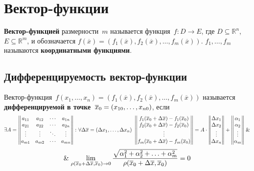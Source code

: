 \section{Вектор-функции}
 \textbf{Вектор-функцией} размерности~$m$ называется функция~$f \colon D \to E$, где $D \subseteq \mathbb R^n$, $E \subseteq \mathbb R^m$, и обозначается
$f(\overline x) = (f_1(\overline x), f_2(\overline x), \ldots, f_m(\overline x))$.
$f_1, \ldots, f_m$ называются \textbf{координатными функциями}.

\subsection{Дифференцируемость вектор-функции}
 Вектор-функция~$f(x_1, \ldots, x_n) = (f_1(\overline x), f_2(\overline x), \ldots, f_m(\overline x))$ называется \textbf{дифференцируемой в точке~$\overline x_0 \opbr= (x_{10}, \ldots, x_{n0})$}, если
\begin{equation*}
\exists A =
\begin{Vmatrix}
a_{11} & a_{12} & \cdots & a_{1n} \\
a_{21} & a_{22} & \cdots & a_{2n} \\
\vdots & \vdots & \ddots & \vdots \\
a_{m1} & a_{m2} & \cdots & a_{mn}
\end{Vmatrix} \colon
\forall \Delta \overline x = (\Delta x_1, \ldots, \Delta x_n) \
\begin{Vmatrix}
f_1(\overline x_0 + \Delta \overline x) - f_1(\overline x_0) \\
f_2(\overline x_0 + \Delta \overline x) - f_2(\overline x_0) \\
\vdots \\
f_m(\overline x_0 + \Delta \overline x) - f_m(\overline x_0)
\end{Vmatrix} =
A \cdot
\begin{Vmatrix}
\Delta x_1 \\
\Delta x_2 \\
\vdots \\
\Delta x_n
\end{Vmatrix} +
\begin{Vmatrix}
\alpha_1 \\
\alpha_2 \\
\vdots \\
\alpha_m
\end{Vmatrix} \mathrel{\&}
\end{equation*}
\begin{equation*}
\mathrel{\&} \lim_{\rho(\overline x_0 + \Delta \overline x, \overline x_0) \to 0}
\frac{\sqrt{\alpha_1^2 + \alpha_2^2 + \ldots + \alpha_m^2}}
{\rho(\overline x_0 + \Delta \overline x, \overline x_0)} = 0
\end{equation*}

